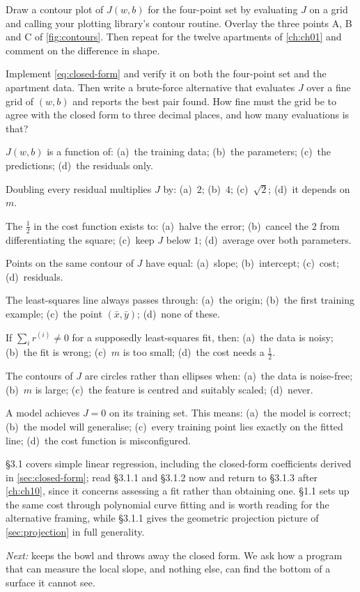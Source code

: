 \pe Draw a contour plot of $J(w,b)$ for the four-point set by evaluating $J$ on
a grid and calling your plotting library's contour routine. Overlay the three
points A, B and C of \cref{fig:contours}. Then repeat for the twelve apartments
of \cref{ch:ch01} and comment on the difference in shape.

\pe Implement \cref{eq:closed-form} and verify it on both the four-point set and
the apartment data. Then write a brute-force alternative that evaluates $J$ over
a fine grid of $(w,b)$ and reports the best pair found. How fine must the grid be
to agree with the closed form to three decimal places, and how many evaluations
is that?


\qz $J(w,b)$ is a function of: (a)~the training data; (b)~the parameters;
(c)~the predictions; (d)~the residuals only.

\qz Doubling every residual multiplies $J$ by: (a)~$2$; (b)~$4$;
(c)~$\sqrt{2}$; (d)~it depends on $m$.

\qz The $\tfrac12$ in the cost function exists to: (a)~halve the error;
(b)~cancel the $2$ from differentiating the square; (c)~keep $J$ below $1$;
(d)~average over both parameters.

\qz Points on the same contour of $J$ have equal: (a)~slope; (b)~intercept;
(c)~cost; (d)~residuals.

\qz The least-squares line always passes through: (a)~the origin; (b)~the first
training example; (c)~the point $(\bar x, \bar y)$; (d)~none of these.

\qz If $\sum_i r^{(i)} \neq 0$ for a supposedly least-squares fit, then:
(a)~the data is noisy; (b)~the fit is wrong; (c)~$m$ is too small; (d)~the cost
needs a $\tfrac12$.

\qz The contours of $J$ are circles rather than ellipses when: (a)~the data is
noise-free; (b)~$m$ is large; (c)~the feature is centred and suitably scaled;
(d)~never.

\qz A model achieves $J = 0$ on its training set. This means: (a)~the model is
correct; (b)~the model will generalise; (c)~every training point lies exactly on
the fitted line; (d)~the cost function is misconfigured.

\furtherreading

\textcite{james2021} §3.1 covers simple linear regression, including the
closed-form coefficients derived in \cref{sec:closed-form}; read §3.1.1 and
§3.1.2 now and return to §3.1.3 after \cref{ch:ch10}, since it concerns
assessing a fit rather than obtaining one. \textcite{bishop2006} §1.1 sets up
the same cost through polynomial curve fitting and is worth reading for the
alternative framing, while §3.1.1 gives the geometric projection picture of
\cref{sec:projection} in full generality.

\bigskip
\noindent\emph{Next:}  keeps the bowl and throws away the closed
form. We ask how a program that can measure the local slope, and nothing else,
can find the bottom of a surface it cannot see.
